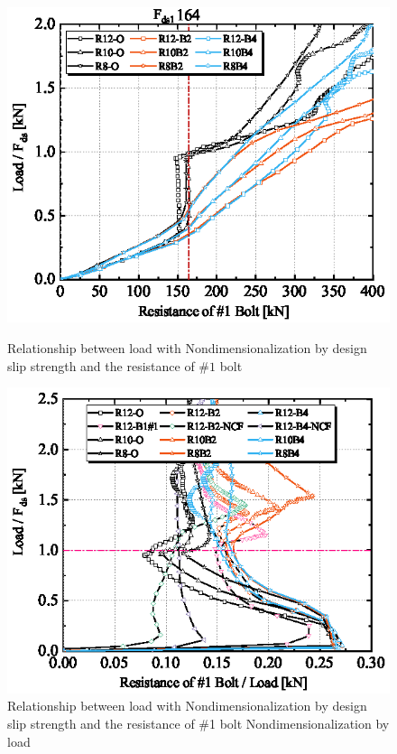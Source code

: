 \begin{figure}
\begin{minipage}[t]{0.49\linewidth}
    \centering
    \includegraphics[width=\linewidth]{imgs/ch5/Load-non-1BS.eps}
    \caption{Relationship between load with Nondimensionalization by design slip strength and the resistance of $\#1$ bolt}
    \label{fig-load-non-1bs}
\end{minipage}
\hspace{0.01\textwidth}
\begin{minipage}[t]{0.49\linewidth}
    \centering
    \includegraphics[width=\linewidth]{imgs/ch5/Load-1BS-alnon.eps}
    \caption{Relationship between load with Nondimensionalization by design slip strength and the resistance of \#1 bolt Nondimensionalization by load}
    \label{fig-load-1bs-alnon}
\end{minipage}
\end{figure}

